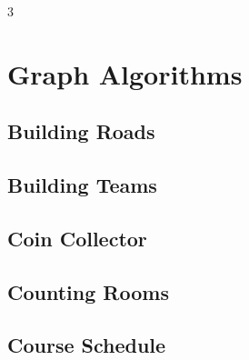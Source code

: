 \documentclass[8pt]{extarticle}
\begin{document}
\pagebreak
\begin{multicols*}{3}

\section{Graph Algorithms}

\subsection{Building Roads}
\begin{caixaenunciado}

\end{caixaenunciado}
\vspace{0.3cm}


\subsection{Building Teams}
\begin{caixaenunciado}

\end{caixaenunciado}
\vspace{0.3cm}


\subsection{Coin Collector}
\begin{caixaenunciado}

\end{caixaenunciado}
\vspace{0.3cm}


\subsection{Counting Rooms}
\begin{caixaenunciado}

\end{caixaenunciado}
\vspace{0.3cm}


\subsection{Course Schedule}
\begin{caixaenunciado}

\end{caixaenunciado}
\vspace{0.3cm}



\end{multicols*}
\end{document}
